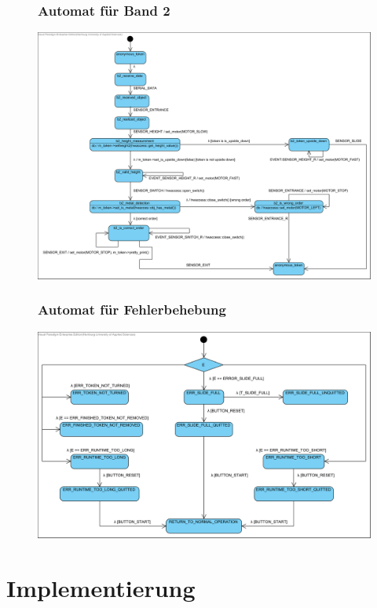 \documentclass[oneside,a4paper,titlepage]{scrartcl} %
\begin{document}
\begin{figure}
	\subsubsection{Automat für Band 2}
	\centering\vfill\includegraphics[angle=0,scale=0.52]{imgs/Band2_FSM.png}
	\subsubsection{Automat für Fehlerbehebung}
	\centering\vfill\includegraphics[angle=0,scale=0.6]{imgs/Error_FSM.png}
\end{figure}

\newpage

\section{Implementierung}
\end{document}
